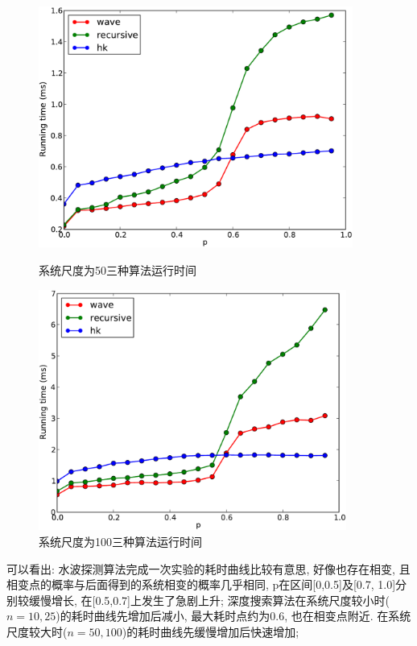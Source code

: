 \documentclass[11pt,a4paper,boxed]{caspset}
\begin{document}
\begin{figure}[!htb]
\begin{minipage}[b]{.5\textwidth}
\centering
\includegraphics[width=0.92\textwidth]{50.pdf}
\caption{\label{size50}系统尺度为50三种算法运行时间}
\end{minipage}
\begin{minipage}[b]{.5\textwidth}
\centering
\includegraphics[width=0.9\textwidth]{100.pdf}
\caption{\label{size100}系统尺度为100三种算法运行时间}
\end{minipage}
\end{figure}
可以看出:
水波探测算法完成一次实验的耗时曲线比较有意思, 好像也存在相变, 且相变点的概率与后面得到的系统相变的概率几乎相同, p在区间[0,0.5]及[0.7, 1.0]分别较缓慢增长, 在[0.5,0.7]上发生了急剧上升; 深度搜索算法在系统尺度较小时($n=10,25$)的耗时曲线先增加后减小, 最大耗时点约为0.6, 也在相变点附近. 在系统尺度较大时($n=50,100$)的耗时曲线先缓慢增加后快速增加;
\end{document}
